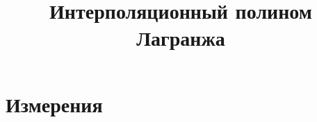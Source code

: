 \documentclass[oneside,final,14pt]{extreport}
\begin{document}
\title{Интерполяционный полином Лагранжа}

\maketitle

\chapter*{Измерения}
\end{document}
